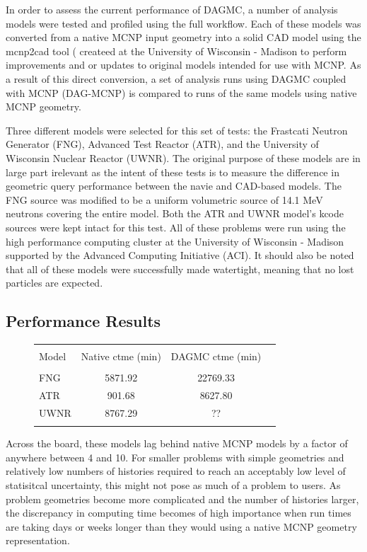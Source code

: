 \documentclass[10pt, a4paper]{article}
\begin{document}
In order to assess the current performance of DAGMC, a number of analysis models were tested and profiled using the full workflow. Each of these models was converted from a native MCNP input geometry into a solid CAD model using the mcnp2cad tool ( createed at the University of Wisconsin - Madison to perform improvements and or updates to original models intended for use with MCNP. As a result of this direct conversion, a set of analysis runs using DAGMC coupled with MCNP (DAG-MCNP) is compared to runs of the same models using native MCNP geometry.

Three different models were selected for this set of tests: the Frastcati Neutron Generator (FNG), Advanced Test Reactor (ATR), and the University of Wisconsin Nuclear Reactor (UWNR). The original purpose of these models are in large part irelevant as the intent of these tests is to measure the difference in geometric query performance between the navie and CAD-based models. The FNG source was modified to be a uniform volumetric source of 14.1 MeV neutrons covering the entire model. Both the ATR and UWNR model's kcode sources were kept intact for this test. All of these problems were run using the high performance computing cluster at the University of Wisconsin - Madison supported by the Advanced Computing Initiative (ACI). It should also be noted that all of these models were successfully made watertight, meaning that no lost particles are expected.

\subsection{Performance Results}%

\begin{figure}[H]
  \centering
  \begin{tabular}{l c c c}
    \toprule \\
    Model & Native ctme (min) & DAGMC ctme (min) \\
    \hline \\
    FNG &  5871.92 & 22769.33 \\
    ATR &  901.68 & 8627.80 \\
    UWNR &  8767.29 & ?? \\
    \hline \\
  \end{tabular}
\end{figure}

Across the board, these models lag behind native MCNP models by a factor of anywhere between 4 and 10. For smaller problems with simple geometries and relatively low numbers of histories required to reach an acceptably low level of statisitcal uncertainty, this might not pose as much of a problem to users. As problem geometries become more complicated and the number of histories larger, the discrepancy in computing time becomes of high importance when run times are taking days or weeks longer than they would using a native MCNP geometry representation.
\end{document}
